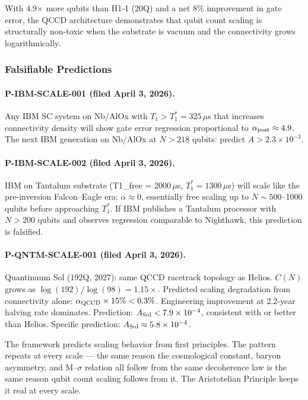 \documentclass[12pt,a4paper]{article}
\begin{document}
With 4.9$\times$ more qubits than H1-1 (20Q) and a net 8\% improvement
in gate error, the QCCD architecture demonstrates that qubit count scaling
is structurally non-toxic when the substrate is vacuum and the connectivity
grows logarithmically.

\subsubsection{Falsifiable Predictions}

\paragraph{P-IBM-SCALE-001 (filed April 3, 2026).}
Any IBM SC system on Nb/AlOx with $T_1 > T_1^* = 325\,\mu$s that increases
connectivity density will show gate error regression proportional to
$\alpha_{\rm post} \approx 4.9$. The next IBM generation on Nb/AlOx at
$N > 218$ qubits: predict $A > 2.3 \times 10^{-3}$.

\paragraph{P-IBM-SCALE-002 (filed April 3, 2026).}
IBM on Tantalum substrate (T1\_free = 2000\,$\mu$s, $T_1^* = 1300\,\mu$s)
will scale like the pre-inversion Falcon--Eagle era: $\alpha \approx 0$,
essentially free scaling up to $N \sim 500$--1000 qubits before approaching
$T_1^*$. If IBM publishes a Tantalum processor with $N > 200$ qubits and
observes regression comparable to Nighthawk, this prediction is falsified.

\paragraph{P-QNTM-SCALE-001 (filed April 3, 2026).}
Quantinuum Sol (192Q, 2027): same QCCD racetrack topology as Helios.
$C(N)$ grows as $\log(192)/\log(98) = 1.15\times$. Predicted scaling
degradation from connectivity alone: $\alpha_{\rm QCCD} \times 15\% < 0.3\%$.
Engineering improvement at 2.2-year halving rate dominates. Prediction:
$A_{\rm Sol} < 7.9 \times 10^{-4}$, consistent with or better than Helios.
Specific prediction: $A_{\rm Sol} \approx 5.8 \times 10^{-4}$.

The framework predicts scaling behavior from first principles. The pattern
repeats at every scale --- the same reason the cosmological constant, baryon
asymmetry, and M--$\sigma$ relation all follow from the same decoherence
law is the same reason qubit count scaling follows from it. The Aristotelian
Principle keeps it real at every scale.
\end{document}
